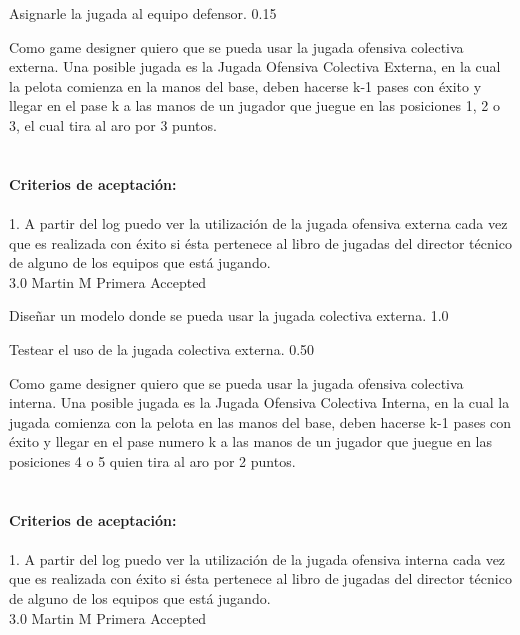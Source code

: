 		{Asignarle la jugada al equipo defensor.} %
		{} %
		{0.15} %
		{} %
		{} %
		{} %
\vspace{20pt}


	{Como game designer quiero que se pueda usar la jugada ofensiva colectiva externa.} %
	{Una posible jugada es la Jugada Ofensiva Colectiva Externa, en la cual la pelota comienza en la manos del base, deben hacerse k-1 pases con éxito y llegar en el pase k a las manos de un jugador que juegue en las posiciones 1, 2 o 3, el cual tira al aro por 3 puntos. \\
  \\
  \\
\textbf{Criterios de aceptación:}\\
  \\
1. A partir del log puedo ver la utilización de la jugada ofensiva externa cada vez que es realizada con éxito si ésta pertenece al libro de jugadas del director técnico de alguno de los equipos que está jugando. \\
} %
	{} %
	{3.0} %
	{Martin M} %
	{Primera} %
	{Accepted} %

		{Diseñar un modelo donde se pueda usar la jugada colectiva externa.} %
		{} %
		{1.0} %
		{} %
		{} %
		{} %

		{Testear el uso de la jugada colectiva externa.} %
		{} %
		{0.50} %
		{} %
		{} %
		{} %

\vspace{20pt}


	{Como game designer quiero que se pueda usar la jugada ofensiva colectiva interna.} %
	{Una posible jugada es la Jugada Ofensiva Colectiva Interna, en la cual la jugada comienza con la pelota en las manos del base, deben hacerse k-1 pases con éxito y llegar en el pase numero k a las manos de un jugador que juegue en las posiciones 4 o 5 quien tira al aro por 2 puntos. \\
  \\
  \\
\textbf{Criterios de aceptación:}\\
  \\
1. A partir del log puedo ver la utilización de la jugada ofensiva interna cada vez que es realizada con éxito si ésta pertenece al libro de jugadas del director técnico de alguno de los equipos que está jugando. \\
} %
	{} %
	{3.0} %
	{Martin M} %
	{Primera} %
	{Accepted} %

